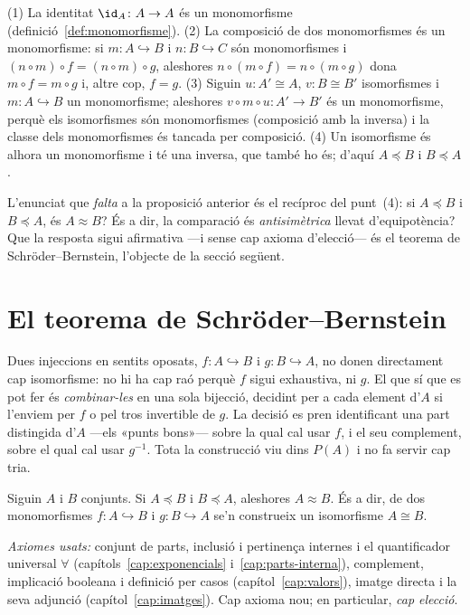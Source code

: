 \begin{prova}
(1) La identitat \(\id_A\colon A\to A\) és un monomorfisme
(definició~\ref{def:monomorfisme}). (2) La composició de dos monomorfismes és
un monomorfisme: si \(m\colon A\hookrightarrow B\) i \(n\colon
B\hookrightarrow C\) són monomorfismes i \((n\circ m)\circ f=(n\circ m)\circ
g\), aleshores \(n\circ(m\circ f)=n\circ(m\circ g)\) dona \(m\circ f=m\circ
g\) i, altre cop, \(f=g\). (3) Siguin \(u\colon A'\cong A\), \(v\colon B\cong
B'\) isomorfismes i \(m\colon A\hookrightarrow B\) un monomorfisme; aleshores
\(v\circ m\circ u\colon A'\to B'\) és un monomorfisme, perquè els
isomorfismes són monomorfismes (composició amb la inversa) i la classe dels
monomorfismes és tancada per composició. (4) Un isomorfisme és alhora un
monomorfisme i té una inversa, que també ho és; d'aquí \(A\preceq B\) i
\(B\preceq A\).
\end{prova}

L'enunciat que \emph{falta} a la proposició anterior és el recíproc del
punt~(4): si \(A\preceq B\) i \(B\preceq A\), és \(A\approx B\)? És a dir, la
comparació és \emph{antisimètrica} llevat d'equipotència? Que la resposta
sigui afirmativa ---i sense cap axioma d'elecció--- és el teorema de
Schröder--Bernstein, l'objecte de la secció següent.

\section{El teorema de Schröder--Bernstein}\label{sec:schroder-bernstein}

Dues injeccions en sentits oposats, \(f\colon A\hookrightarrow B\) i
\(g\colon B\hookrightarrow A\), no donen directament cap isomorfisme: no hi
ha cap raó perquè \(f\) sigui exhaustiva, ni \(g\). El que sí que es pot fer
és \emph{combinar-les} en una sola bijecció, decidint per a cada element
d'\(A\) si l'enviem per \(f\) o pel tros invertible de \(g\). La decisió es
pren identificant una part distingida d'\(A\) ---els «punts bons»--- sobre la
qual cal usar \(f\), i el seu complement, sobre el qual cal usar
\(g^{-1}\). Tota la construcció viu dins \(P(A)\) i no fa servir cap tria.

\begin{teorema}\label{teo:schroder-bernstein}
Siguin \(A\) i \(B\) conjunts. Si \(A\preceq B\) i \(B\preceq A\), aleshores
\(A\approx B\). És a dir, de dos monomorfismes \(f\colon A\hookrightarrow B\)
i \(g\colon B\hookrightarrow A\) se'n construeix un isomorfisme
\(A\cong B\).\par
\emph{Axiomes usats:} conjunt de parts, inclusió i pertinença internes i el
quantificador universal \(\forall\) (capítols~\ref{cap:exponencials}
i~\ref{cap:parts-interna}), complement, implicació booleana i definició per
casos (capítol~\ref{cap:valors}), imatge directa i la seva adjunció
(capítol~\ref{cap:imatges}). Cap axioma nou; en particular, \emph{cap
elecció}.
\end{teorema}

